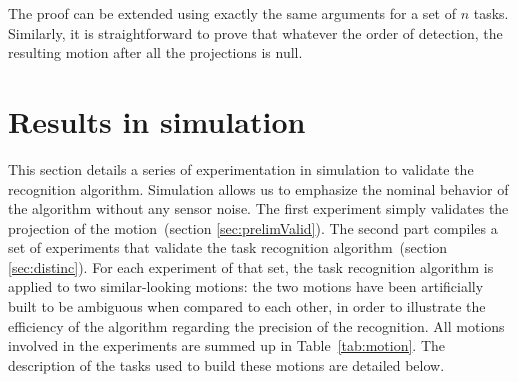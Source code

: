 \documentclass[journal]{IEEEtran}
\begin{document}

\medskip
 The proof can be extended using exactly the same arguments for
a set of $n$ tasks.
Similarly, it is straightforward to prove that whatever the order of detection, 
the resulting motion after all the projections is null.

\section{Results in simulation}
\label{sec:simu}
This section details a series of experimentation in simulation to validate the recognition algorithm.
Simulation allows us to emphasize the nominal behavior of the algorithm without 
any sensor noise.
The first experiment simply validates the projection of the motion~(section \ref{sec:prelimValid}). 
The second part compiles a set of experiments that validate the task recognition algorithm~(section \ref{sec:distinc}).
For each experiment of that set, the task recognition algorithm 
is applied to two similar-looking motions:
the two motions have been artificially built to be ambiguous when 
compared to each other, in order to illustrate the 
efficiency of the algorithm regarding the precision of the recognition.
All motions involved in the experiments are summed up in Table~\ref{tab:motion}.
The description of the tasks used to build these motions are detailed below.
\end{document}
